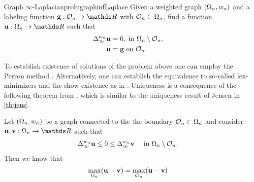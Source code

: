 \begin{problem}{Graph $\infty$-Laplacian}{prob:graphinfLaplace}
Given a weighted graph $(\Omega_n, w_n)$ and a labeling function $\vec g:\conset_n\to\R$ with $\mathcal{O}_n\subset\Omega_n$, find 
a function $\vec u:\domain_n\to\R$ such that
%
\begin{align*}
\Delta_\infty^{w_n} \mathbf{u} &= 0, \text{ in } \Omega_n\setminus \mathcal{O}_n,\\
\mathbf{u} &= \mathbf{g} \text{ on } \mathcal{O}_n.
\end{align*}
\end{problem}
%
%
\noindent%
To establish existence of solutions of the problem above one can employ the Perron method \cite{perron1923neue}. Alternatively, one can establish the equivalence to so-called lex-minimizers and the show existence as in \cite[Th. 3.3]{kyng2015algorithms}. Uniqueness is a consequence of the following theorem from \cite{calder2019consistency}, which is similar to the uniqueness result of Jensen in \cref{th:jens}.
%
\begin{theorem}{\cite[Th. 3.1]{calder2019consistency}}{}
Let $(\Omega_n,w_n)$ be a graph connected to the the boundary $\mathcal{O}_n\subset\Omega_n$ and consider $\vec u,\vec v:\domain_n\to\R$ such that
%
\begin{align*}
\Delta^{w_n}_\infty \mathbf{u} \leq 0 \leq \Delta^{w_n}_\infty \mathbf{v}
\quad\text{ in } \Omega_n\setminus\mathcal{O}_n.
\end{align*}
%
Then we know that
%
\begin{align*}
\max_{\Omega_n} (\mathbf{u} - \mathbf{v}) = \max_{\mathcal{O}_n} (\mathbf{u} - \mathbf{v})
\end{align*}
\end{theorem}
%
%
